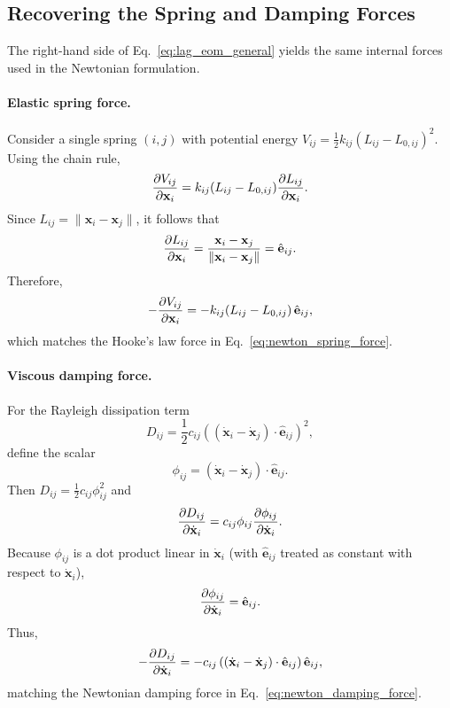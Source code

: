 \documentclass[manuscript,nonacm,12pt,letterpaper]{acmart}
\begin{document}
\subsection{Recovering the Spring and Damping Forces}
\label{Sec5.5:RecoveringForces}

The right-hand side of Eq.~\eqref{eq:lag_eom_general} yields the same internal forces used in the Newtonian formulation.

\paragraph{Elastic spring force.}
Consider a single spring $(i,j)$ with potential energy $V_{ij}=\frac{1}{2}k_{ij}(L_{ij}-L_{0,ij})^2$. Using the chain rule,
\[
\pdv{V_{ij}}{\mathbf{x}_i}
=
k_{ij}(L_{ij}-L_{0,ij})
\pdv{L_{ij}}{\mathbf{x}_i}.
\]
Since $L_{ij}=\|\mathbf{x}_i-\mathbf{x}_j\|$, it follows that
\[
\pdv{L_{ij}}{\mathbf{x}_i} = \frac{\mathbf{x}_i-\mathbf{x}_j}{\|\mathbf{x}_i-\mathbf{x}_j\|}
= \hat{\mathbf{e}}_{ij}.
\]
Therefore,
\begin{equation}
-\pdv{V_{ij}}{\mathbf{x}_i}
=
-k_{ij}(L_{ij}-L_{0,ij})\,\hat{\mathbf{e}}_{ij},
\label{eq:lag_force_spring}
\end{equation}
which matches the Hooke's law force in Eq.~\eqref{eq:newton_spring_force}.

\paragraph{Viscous damping force.}
For the Rayleigh dissipation term
\[
D_{ij} = \frac{1}{2}c_{ij}\left( (\dot{\mathbf{x}}_i-\dot{\mathbf{x}}_j)\cdot \hat{\mathbf{e}}_{ij} \right)^2,
\]
define the scalar
\[
\phi_{ij} = (\dot{\mathbf{x}}_i-\dot{\mathbf{x}}_j)\cdot \hat{\mathbf{e}}_{ij}.
\]
Then $D_{ij} = \frac{1}{2}c_{ij}\phi_{ij}^2$ and
\[
\pdv{D_{ij}}{\dot{\mathbf{x}}_i}
=
c_{ij}\phi_{ij}\pdv{\phi_{ij}}{\dot{\mathbf{x}}_i}.
\]
Because $\phi_{ij}$ is a dot product linear in $\dot{\mathbf{x}}_i$ (with $\hat{\mathbf{e}}_{ij}$ treated as constant with respect to $\dot{\mathbf{x}}_i$),
\[
\pdv{\phi_{ij}}{\dot{\mathbf{x}}_i} = \hat{\mathbf{e}}_{ij}.
\]
Thus,
\begin{equation}
-\pdv{D_{ij}}{\dot{\mathbf{x}}_i}
=
-c_{ij}\left( (\dot{\mathbf{x}}_i-\dot{\mathbf{x}}_j)\cdot \hat{\mathbf{e}}_{ij} \right)\hat{\mathbf{e}}_{ij},
\label{eq:lag_force_damping}
\end{equation}
matching the Newtonian damping force in Eq.~\eqref{eq:newton_damping_force}.
\end{document}
